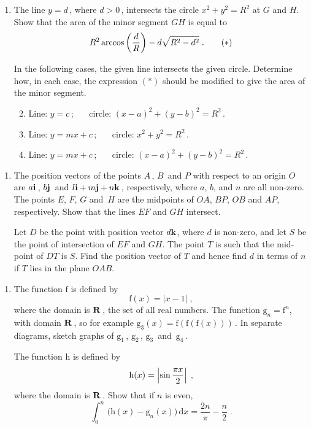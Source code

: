 \documentclass[a4, 11pt]{report}
\newlength{\qspace}
\newcounter{qnumber}
\newenvironment{question}%
 {\vspace{\qspace}
  \begin{enumerate}[\bfseries 1\quad][10]%
    \setcounter{enumi}{\value{qnumber}}%
    \item%
 }
{
  \end{enumerate}
  \filbreak
  \stepcounter{qnumber}
 }
\newenvironment{questionparts}[1][1]%
 {
  \begin{enumerate}[\bfseries (i)]%
    \setcounter{enumii}{#1}
    \addtocounter{enumii}{-1}
    \setlength{\itemsep}{5mm}
    \setlength{\parskip}{8pt}
 }
 {
  \end{enumerate}
 }
\def\d{{\mathrm d}}
\def\g{{\mathrm g}}
\def\h{{\mathrm h}}
\def\f{{\mathrm f}}
\begin{document}
\begin{question}
The line $y=d\,$, where $d>0\,$,
intersects the circle $x^2+y^2=R^2$ at $G$ and $H$. Show
that the area of the minor segment $GH$ is equal to
\begin{equation}
R^2\arccos \left({d \over R}\right) -d\sqrt{R^2 - d^2}\;.
\tag
{$*$}
\end{equation}


In the following cases, the given line intersects the
given circle. Determine how, in each case, the expression $(*)$ should be modified
to give the area of the minor
segment.


  
\begin{questionparts}
\item
Line: $y=c\,$; \ \ \ circle: $(x-a)^2+(y-b)^2=R^2\,$. 

\item
Line: $y=mx+c\, $;  \ \ \  circle: $x^2+y^2=R^2\,$. 


\item
Line: $y=mx+c\,$; \ \ \ circle: $(x-a)^2+(y-b)^2=R^2\,$.
\end{questionparts}
\end{question}

\begin{question}
The position vectors of 
the points $A\,$, $B\,$ and $P$ with respect to an origin $O$ 
are $a{\bf i}\,$,  $b{\bf j}\,$ and  $l{\bf i}+m{\bf j}+n{\bf k}\,$, respectively,
where $a$, $b$, and $n$ are all non-zero. The points $E$, $F$, $G$ and~$H$ 
are the midpoints of $OA$, $BP$, $OB$ and  $AP$, respectively.  
Show that the lines
$EF$ and $GH$  intersect.


Let $D$ be the point with position vector $d{\bf k}$, where $d$ is non-zero, 
and let $S$ be the point of intersection of $EF$ and $GH.$
The point $T$ is such that the mid-point of $DT$ is $S$. 
Find the position vector of $T$ and hence find $d$ in terms of $n$
if $T$ lies  in the plane $OAB$. 
	\end{question}
	
\begin{question}
 The function $\f$  is defined by 
$$
\f(x)=  \vert x-1 \vert\;,
$$
where the domain is ${\bf R}\,$, the set of all real numbers. 
The function $\g_n =\f^n$, with domain ${\bf R}\,$, 
so for example $\g_3(x) = \f(\f(\f(x)))\,$.
In separate diagrams, sketch graphs of $\g_1\,$, $\g_2\,$, $\g_3\,$ and~$\g_4\,$.



The function $\h$ is defined by
\[
\h(x) = \left\vert \sin {{{\pi}x} \over 2} \right\vert\;,
\]
where  the domain is ${\bf R}\,$. Show that if $n$ is even,
\[
\int_0^n\,\big( \h(x)-\g_n(x)\big)\,\d x = \frac{2n}{\pi} -\frac{n}2\;.
\]
\end{question}
	
\end{document}
